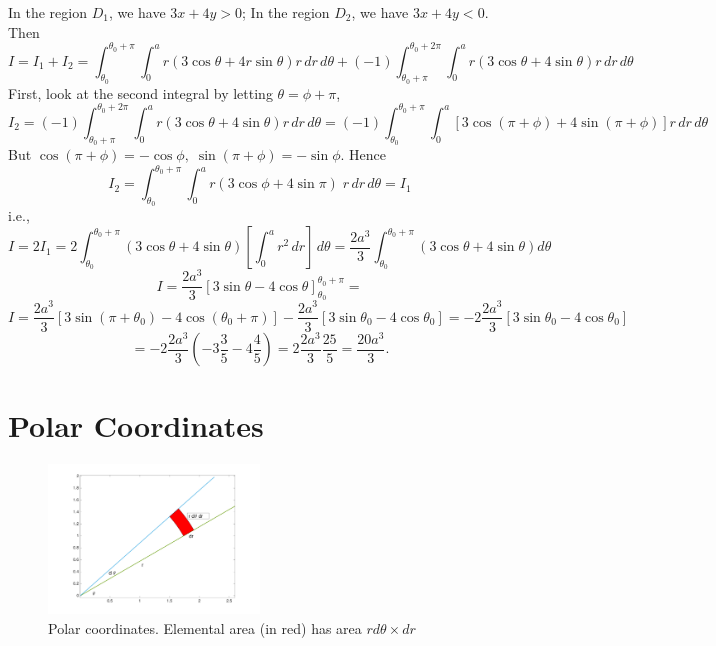 \documentclass{article}
\begin{document}
In the region $D_1$, we have $ 3x+4y>0$; In the region $D_2$, we
have $ 3x+4y <0$. Then
$$
I = I_1+I_2= \int_{\theta_0}^{\theta_0+\pi} \int_0^a r( 3 \cos
\theta+4r \sin \theta ) r  \, dr \, d \theta + (-1) \int_{\theta_0
+\pi}^{\theta_0+2\pi} \int_0^a r( 3 \cos \theta+4 \sin \theta ) r
\, dr \, d \theta
$$
First, look at the second integral by letting $\theta=\phi + \pi$,
$$
I_2= (-1) \int_{\theta_0 +\pi}^{\theta_0+2\pi} \int_0^a r( 3 \cos
\theta+4 \sin \theta ) r \, dr \, d \theta=(-1) \int_{\theta_0
}^{\theta_0+\pi} \int_0^a  \left[ 3 \cos (\pi +\phi)+4 \sin(\pi
+\phi) \right]  r \, dr \, d \theta
$$
But $\cos (\pi +\phi)=-\cos \phi,\; \sin(\pi +\phi)=-\sin \phi$.
Hence
$$
I_2= \int_{\theta_0 }^{\theta_0+\pi} \int_0^a r \left( 3 \cos
\phi+ 4 \sin \pi \right)  \;  r \, dr \, d \theta =I_1
$$
i.e.,
$$
I = 2I_1= 2\int_{\theta_0}^{\theta_0+\pi}  ( 3 \cos \theta+4 \sin
\theta ) \left[ \int_0^a r^2  \, dr \right] \, d \theta=\frac{2
a^3}{3} \int_{\theta_0}^{\theta_0+\pi}  ( 3 \cos \theta+4 \sin
\theta ) d \theta
$$
$$
I = \frac{2 a^3}{3} \left[ 3 \sin \theta-4 \cos \theta
\right]_{\theta_0}^{\theta_0+\pi}=
$$
$$
I=\frac{2 a^3}{3}\left[ 3 \sin(\pi+ \theta_0)-4 \cos
(\theta_0+\pi) \right]- \frac{2 a^3}{3}\left[ 3 \sin \theta_0-4
\cos \theta_0 \right]=-2 \frac{2 a^3}{3} \left[ 3 \sin \theta_0-4
\cos \theta_0 \right]
$$
$$
=-2 \frac{2 a^3}{3}\left(-3 \frac{3}{5} -4 \frac{4 }{5} \right)=2
\frac{2 a^3}{3} \frac{25}{5}= \frac{20 a^3}{3}.
$$

\bigskip

\section{Polar Coordinates}

\begin{figure}[!ht]
\vspace{-.5cm}
\centering
\includegraphics[width = 0.5\textwidth]{polar_stuff.pdf}%
\caption{Polar coordinates. Elemental area (in red) has area $ r d \theta  \times dr$}
\label{polar_element}
\end{figure}
\end{document}
